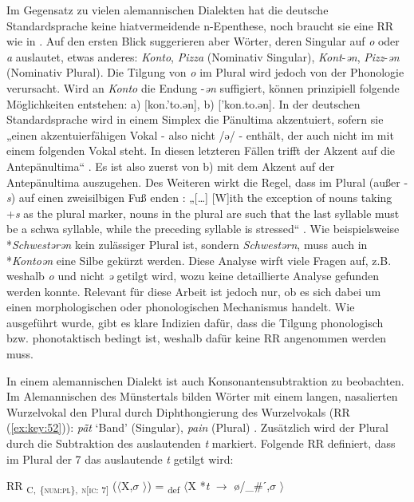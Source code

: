 Im Gegensatz zu vielen alemannischen Dialekten hat die deutsche Standardsprache keine hiatvermeidende n-Epenthese, noch braucht sie eine RR wie in . Auf den ersten Blick suggerieren aber Wörter, deren Singular auf \textit{o} oder \textit{a} auslautet, etwas anderes: \textit{Konto}, \textit{Pizza} (Nominativ Singular), \textit{Kont}-\textit{ən}, \textit{Pizz}-\textit{ən} (Nominativ Plural). Die Tilgung von \textit{o} im Plural wird jedoch von der Phonologie verursacht. Wird an \textit{Konto} die Endung -\textit{ən} suffigiert, können prinzipiell folgende Möglichkeiten entstehen: a) [kon.'to.ən], b) ['kon.to.ən]. In der deutschen Standardsprache wird in einem Simplex die Pänultima akzentuiert, sofern sie „einen akzentuierfähigen Vokal - also nicht /ə/ - enthält, der auch nicht im  mit einem folgenden Vokal steht. In diesen letzteren Fällen trifft der Akzent auf die Antepänultima“ \citep[186]{Kohler1995}. Es ist also zuerst von b) mit dem Akzent auf der Antepänultima auszugehen. Des Weiteren wirkt die Regel, dass  im Plural (außer -\textit{s}) auf einen zweisilbigen Fuß enden \citep[ 61-62, 106-109]{Wiese1996}: „[…] [W]ith the exception of nouns taking +\textit{s} as the plural marker, nouns in the plural are such that the last syllable must be a schwa syllable, while the preceding syllable is stressed“ \citep[61]{Wiese1996}. Wie beispielsweise *\textit{Schwestərən} kein zulässiger Plural ist, sondern \textit{Schwestərn}, muss auch in *\textit{Kontoən} eine Silbe gekürzt werden. Diese Analyse wirft viele Fragen auf, z.B. weshalb \textit{o} und nicht \textit{ə} getilgt wird, wozu keine detaillierte Analyse gefunden werden konnte. Relevant für diese Arbeit ist jedoch nur, ob es sich dabei um einen morphologischen oder phonologischen Mechanismus handelt. Wie ausgeführt wurde, gibt es klare Indizien dafür, dass die Tilgung phonologisch bzw. phonotaktisch bedingt ist, weshalb dafür keine RR angenommen werden muss.

In einem alemannischen Dialekt ist auch Konsonantensubtraktion zu beobachten. Im Alemannischen des Münstertals bilden Wörter mit einem langen, nasalierten Wurzelvokal den Plural durch Diphthongierung des Wurzelvokals (RR (\ref{ex:key:52})): \textit{p\~{\=a}t} ‘Band’ (Singular), \textit{pain} (Plural) \citep[43]{Mankel1886}. Zusätzlich wird der Plural durch die Subtraktion des auslautenden \textit{t} markiert. Folgende RR definiert, dass im Plural der  7 das auslautende \textit{t} getilgt wird:

\ea%
\label{ex:key:59}
 RR \textsubscript{C,} \textsubscript{\{\textsc{num:pl}\},} \textsubscript{\textsc{n[}\textsc{ic:} 7]} ($\langle$X,$\sigma$ $\rangle$) = \textsubscript{def} $\langle$X *\textit{t} $\rightarrow$ ø/\_\#ˊ,$\sigma$ $\rangle$\\
\z

